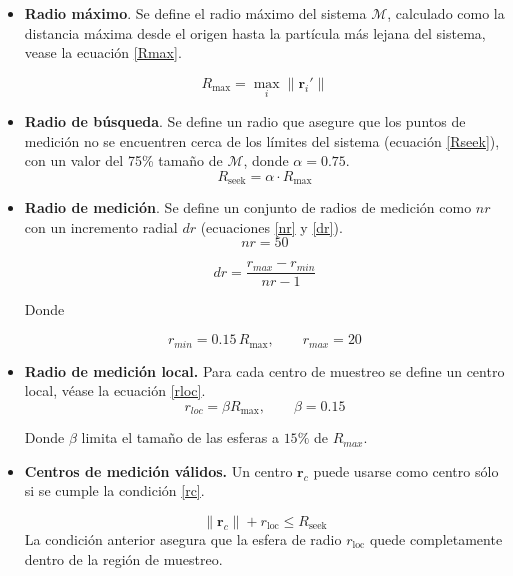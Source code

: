 	\begin{itemize}
		
		\item \textbf{Radio máximo}. Se define el radio máximo del sistema $\mathcal{M}$, calculado como la distancia máxima desde el origen hasta la partícula más lejana del sistema, vease la ecuación \ref{Rmax}.
		
		\begin{equation}
			R_{\text{max}} = \max_i \|\mathbf{r}_i'\|
			\label{Rmax}
		\end{equation}
		
		
		\item \textbf{Radio de búsqueda}. Se define un radio que asegure que los puntos de medición no se encuentren cerca de los límites del sistema (ecuación \ref{Rseek}), con un valor del 75\% tamaño de $\mathcal{M}$, donde $\alpha = 0.75$.
		\begin{equation}
			R_{\text{seek}} = \alpha \cdot R_{\text{max}}
			\label{Rseek}
		\end{equation}
		
		
		\item \textbf{Radio de medición}. Se define un conjunto de radios de medición como $nr$ con un incremento radial $dr$ (ecuaciones \ref{nr} y \ref{dr}).
		\begin{equation}
			nr = 50 
			\label{nr}
		\end{equation}
		
		\begin{equation}
			dr = \frac{r_{max}-r_{min}}{nr-1}
			\label{dr}
		\end{equation}
		
		Donde 
		
		\begin{equation}
			r_{min} = 0.15\, R_{\text{max}}, \qquad
			r_{max} = 20
		\end{equation}
		
		
		\item \textbf{Radio de medición local.} Para cada centro de muestreo se define
		un centro local, véase la ecuación \ref{rloc}.
		\begin{equation}
			r_{loc} = \beta R_{\text{max}}, \qquad \beta = 0.15
			\label{rloc}
		\end{equation} 
		
		Donde $\beta$ limita el tamaño de las esferas a $15\%$ de $R_{max}$.
		
		\item \textbf{Centros de medición válidos.} 
		Un centro $\mathbf{r}_c$ puede usarse como centro sólo si se cumple la condición \ref{rc}. 
		
		\begin{equation}
			\|\mathbf{r}_c\| + r_{\mathrm{loc}} \le R_{\text{seek}}
			\label{rc}
		\end{equation}
		La condición anterior asegura que la esfera de radio $r_{\text{loc}}$ quede completamente dentro de la región de muestreo.
		\end{itemize}

